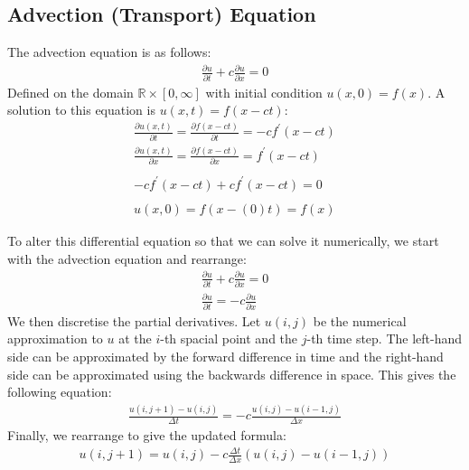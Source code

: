 \documentclass[]{article}
\newcommand{\real}{\mathbb{R}}
\begin{document}
	\subsection{Advection (Transport) Equation}
	The advection equation is as follows:
	\begin{align}
		\frac{\partial u}{\partial t} + c \frac{\partial u}{\partial x} = 0
	\end{align}
	Defined on the domain $ \real \times [0, \infty] $ with initial condition $ u(x, 0) = f(x) $. A solution to this equation is $ u(x, t) = f(x - ct) $:
	\begin{align}
		\frac{\partial u(x, t)}{\partial t} = \frac{\partial f(x - ct)}{\partial t} = -c f^\prime(x - ct) \nonumber \\
		\frac{\partial u(x, t)}{\partial x} = \frac{\partial f(x - ct)}{\partial x} = f^\prime(x - ct) \nonumber \\ \nonumber \\
		-c f^\prime(x - ct) + cf^\prime(x - ct) = 0 \nonumber \\ \nonumber \\ \nonumber 
		u(x, 0) = f(x - (0)t) = f(x)
	\end{align}

	To alter this differential equation so that we can solve it numerically, we start with the advection equation and rearrange:
	\begin{align}
		\frac{\partial u}{\partial t} + c \frac{\partial u}{\partial x} = 0 \\
		\frac{\partial u}{\partial t} =  -c \frac{\partial u}{\partial x} 
	\end{align}
	We then discretise the partial derivatives. Let $u(i, j)$ be the numerical approximation to $u$ at the $i$-th spacial point and the $j$-th time step. The left-hand side can be approximated by the forward difference in time and the right-hand side can be approximated using the backwards difference in space. This gives the following equation:
	\begin{align}
		\frac{u(i, j + 1) - u(i, j)}{\Delta t} = -c \frac{u(i, j) - u(i - 1, j)}{\Delta x}
	\end{align}
	Finally, we rearrange to give the updated formula: 
	\begin{align}
		u(i, j + 1) = u(i, j) - c\frac{\Delta t}{\Delta x}(u(i, j) - u(i - 1, j))
	\end{align}
\end{document}
